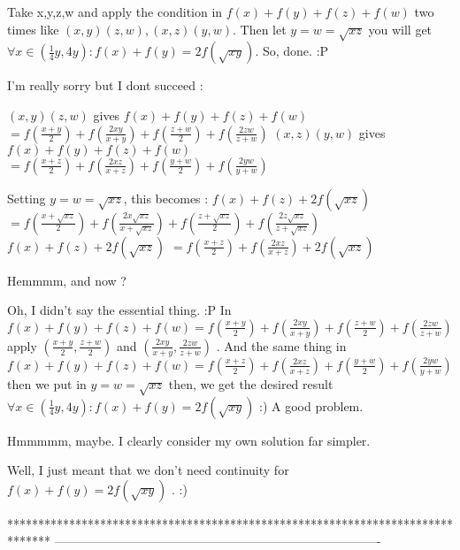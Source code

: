 \begin{solution}
	\begin{tcolorbox}Take x,y,z,w and apply the condition in $ f(x)+f(y)+f(z)+f(w) $ two times like $ (x,y)(z,w) ,(x,z)(y,w) $. Then let $ y=w=\sqrt{xz} $ you will get 
$ \forall x\in (\frac{1}{4}y,4y): f(x)+f(y)=2f(\sqrt{xy}) $. So, done. :P\end{tcolorbox}
I'm really sorry but I dont succeed :

$(x,y)(z,w)$ gives $f(x)+f(y)+f(z)+f(w)$ $=f(\frac{x+y}2)+f(\frac{2xy}{x+y})+f(\frac{z+w}2)+f(\frac{2zw}{z+w})$
$(x,z)(y,w)$ gives $f(x)+f(y)+f(z)+f(w)$ $=f(\frac{x+z}2)+f(\frac{2xz}{x+z})+f(\frac{y+w}2)+f(\frac{2yw}{y+w})$

Setting  $y=w=\sqrt{xz}$, this becomes :
$f(x)+f(z)+2f(\sqrt{xz})$ $=f(\frac{x+\sqrt{xz}}2)+f(\frac{2x\sqrt{xz}}{x+\sqrt{xz}})+f(\frac{z+\sqrt{xz}}2)+f(\frac{2z\sqrt{xz}}{z+\sqrt{xz}})$
$f(x)+f(z)+2f(\sqrt{xz})$ $=f(\frac{x+z}2)+f(\frac{2xz}{x+z})+2f(\sqrt{xz})$

Hemmmm, and now ?
\end{solution}



\begin{solution}
	Oh, I didn't say the essential thing. :P
In $ f(x)+f(y)+f(z)+f(w) =f(\frac{x+y}{2})+f(\frac{2xy}{x+y})+f(\frac{z+w}{2})+f(\frac{2zw}{z+w}) $ apply $ (\frac{x+y}{2},\frac{z+w}{2}) $ and $ 
(\frac{2xy}{x+y},\frac{2zw}{z+w}) $ .
And the same thing in  $ f(x)+f(y)+f(z)+f(w)=f(\frac{x+z}{2})+f(\frac{2xz}{x+z})+f(\frac{y+w}{2})+f(\frac{2yw}{y+w}) $ then we put in $ y=w=\sqrt{xz} $ then, we get the desired result $ \forall x\in (\frac{1}{4}y,4y): f(x)+f(y)=2f(\sqrt{xy}) $ :) A good problem.
\end{solution}



\begin{solution}
	Hmmmmm, maybe.
I clearly consider my own solution far simpler.
\end{solution}



\begin{solution}
	Well, I just meant that we don't need continuity for $ f(x)+f(y)=2f(\sqrt{xy}) $ .  :)
\end{solution}
*******************************************************************************
-------------------------------------------------------------------------------

